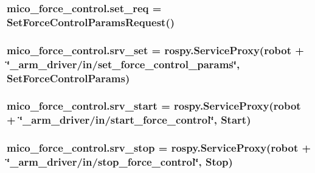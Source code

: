 \subsubsection[{\texorpdfstring{set\+\_\+req}{set_req}}]{\setlength{\rightskip}{0pt plus 5cm}mico\+\_\+force\+\_\+control.\+set\+\_\+req = Set\+Force\+Control\+Params\+Request()}\hypertarget{namespacemico__force__control_adaac210d765d56a858099e0da5985634}{}\label{namespacemico__force__control_adaac210d765d56a858099e0da5985634}
\subsubsection[{\texorpdfstring{srv\+\_\+set}{srv_set}}]{\setlength{\rightskip}{0pt plus 5cm}mico\+\_\+force\+\_\+control.\+srv\+\_\+set = rospy.\+Service\+Proxy({\bf robot} + \char`\"{}\+\_\+arm\+\_\+driver/in/set\+\_\+force\+\_\+control\+\_\+params\char`\"{}, Set\+Force\+Control\+Params)}\hypertarget{namespacemico__force__control_aec902d9fa26ad89858657a5c69604244}{}\label{namespacemico__force__control_aec902d9fa26ad89858657a5c69604244}
\subsubsection[{\texorpdfstring{srv\+\_\+start}{srv_start}}]{\setlength{\rightskip}{0pt plus 5cm}mico\+\_\+force\+\_\+control.\+srv\+\_\+start = rospy.\+Service\+Proxy({\bf robot} + \char`\"{}\+\_\+arm\+\_\+driver/in/start\+\_\+force\+\_\+control\char`\"{}, Start)}\hypertarget{namespacemico__force__control_ad419a15a7ffa6346e96486103e629a03}{}\label{namespacemico__force__control_ad419a15a7ffa6346e96486103e629a03}
\subsubsection[{\texorpdfstring{srv\+\_\+stop}{srv_stop}}]{\setlength{\rightskip}{0pt plus 5cm}mico\+\_\+force\+\_\+control.\+srv\+\_\+stop = rospy.\+Service\+Proxy({\bf robot} + \char`\"{}\+\_\+arm\+\_\+driver/in/stop\+\_\+force\+\_\+control\char`\"{}, Stop)}\hypertarget{namespacemico__force__control_a2cebf1d67600a8e0e30509e127b2ca15}{}\label{namespacemico__force__control_a2cebf1d67600a8e0e30509e127b2ca15}
